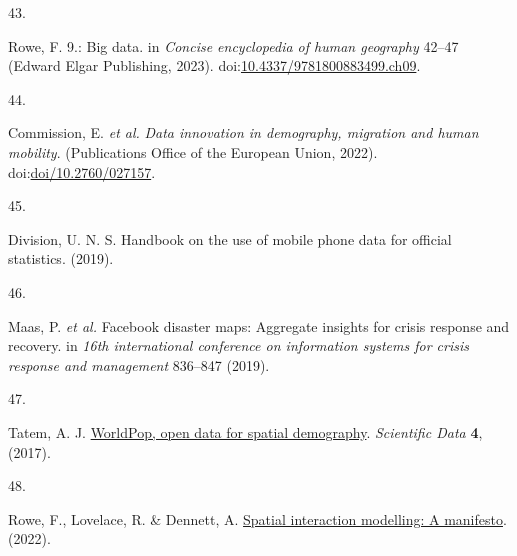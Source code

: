 \documentclass[
  11pt,
]{article}
\newlength{\cslhangindent}
\newlength{\csllabelwidth}
\newenvironment{CSLReferences}[2] %
 {\begin{list}{}{%
  \setlength{\itemindent}{0pt}
  \setlength{\leftmargin}{0pt}
  \setlength{\parsep}{0pt}
  \ifodd #1
   \setlength{\leftmargin}{\cslhangindent}
   \setlength{\itemindent}{-1\cslhangindent}
  \fi
  \setlength{\itemsep}{#2\baselineskip}}}
 {\end{list}}
\newcommand{\CSLLeftMargin}[1]{\parbox[t]{\csllabelwidth}{\strut#1\strut}}
\newcommand{\CSLRightInline}[1]{\parbox[t]{\linewidth - \csllabelwidth}{\strut#1\strut}}
\begin{document}
\begin{CSLReferences}{0}{0}
\CSLLeftMargin{43. }%
\CSLRightInline{Rowe, F. 9.: Big data. in \emph{Concise encyclopedia of
human geography} 42--47 (Edward Elgar Publishing, 2023).
doi:\href{https://doi.org/10.4337/9781800883499.ch09}{10.4337/9781800883499.ch09}.}

\CSLLeftMargin{44. }%
\CSLRightInline{Commission, E. \emph{et al.} \emph{Data innovation in
demography, migration and human mobility}. (Publications Office of the
European Union, 2022).
doi:\href{https://doi.org/doi/10.2760/027157}{doi/10.2760/027157}.}

\CSLLeftMargin{45. }%
\CSLRightInline{Division, U. N. S. Handbook on the use of mobile phone
data for official statistics. (2019).}

\CSLLeftMargin{46. }%
\CSLRightInline{Maas, P. \emph{et al.} Facebook disaster maps: Aggregate
insights for crisis response and recovery. in \emph{16th international
conference on information systems for crisis response and management}
836--847 (2019).}

\CSLLeftMargin{47. }%
\CSLRightInline{Tatem, A. J.
\href{https://doi.org/10.1038/sdata.2017.4}{WorldPop, open data for
spatial demography}. \emph{Scientific Data} \textbf{4}, (2017).}

\CSLLeftMargin{48. }%
\CSLRightInline{Rowe, F., Lovelace, R. \& Dennett, A.
\href{http://dx.doi.org/10.31219/osf.io/xcdms}{Spatial interaction
modelling: A manifesto}. (2022).}

\end{CSLReferences}
\end{document}
